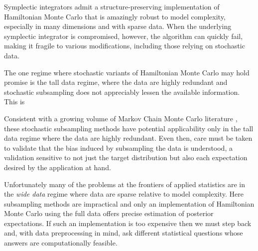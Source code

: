 \documentclass{article}
\begin{document}
Symplectic integrators admit a structure-preserving implementation of
Hamiltonian Monte Carlo that is amazingly robust to model complexity,
especially in many dimensions and with sparse data.  When the
underlying symplectic integrator is compromised, however, the algorithm
can quickly fail, making it fragile to various modifications, including those
relying on stochastic data.

The one regime where stochastic variants of Hamiltonian Monte Carlo
may hold promise is the tall data regime, where the data are highly
redundant and stochastic subsampling does not appreciably lessen
the available information.  This is 

Consistent with a growing volume of Markov Chain Monte Carlo literature 
\cite{NeiswangerEtAl:2013, BardenetEtAl:2014}, these stochastic
subsampling methods have potential applicability only in the tall data regime 
where the data are highly redundant.  Even then, care must be taken to 
validate that the bias induced by subsampling the data is understood,
a validation sensitive to not just the target distribution but also each
expectation desired by the application at hand.

Unfortunately many of the problems at the frontiers of applied statistics are 
in the \textit{wide data} regime where data are sparse relative to model 
complexity.  Here subsampling methods are impractical and only an
implementation of Hamiltonian Monte Carlo using the full data offers
precise estimation of posterior expectations.  If such an implementation
is too expensive then we must step back and, with data preprocessing
in mind, ask different statistical questions whose answers are computationally 
feasible.






\end{document}

